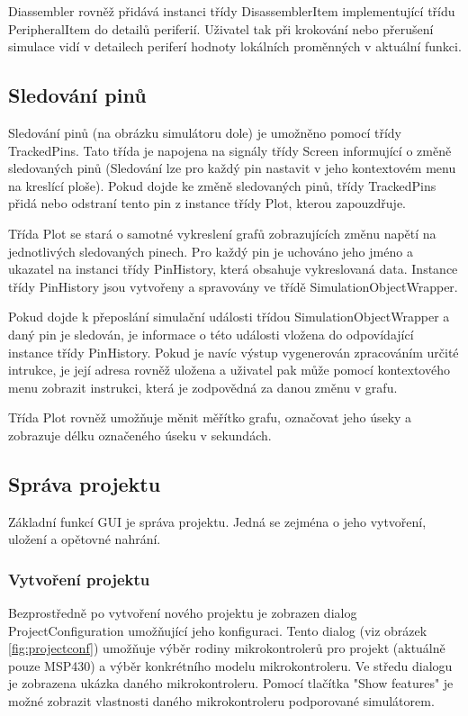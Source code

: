Diassembler rovněž přidává instanci třídy DisassemblerItem implementující třídu PeripheralItem do detailů periferií. Uživatel tak při krokování nebo přerušení simulace vidí v detailech periferí hodnoty lokálních proměnných v aktuální funkci.

\subsection{Sledování pinů}
\label{screen_tracking}

Sledování pinů (na obrázku simulátoru dole) je umožněno pomocí třídy TrackedPins. Tato třída je napojena na signály třídy Screen informující o změně sledovaných pinů (Sledování lze pro každý pin nastavit v jeho kontextovém menu na kreslící ploše). Pokud dojde ke změně sledovaných pinů, třídy TrackedPins přidá nebo odstraní tento pin z instance třídy Plot, kterou zapouzdřuje.

Třída Plot se stará o samotné vykreslení grafů zobrazujících změnu napětí na jednotlivých sledovaných pinech. Pro každý pin je uchováno jeho jméno a ukazatel na instanci třídy PinHistory, která obsahuje vykreslovaná data. Instance třídy PinHistory jsou vytvořeny a spravovány ve třídě SimulationObjectWrapper.

Pokud dojde k přeposlání simulační události třídou SimulationObjectWrapper a daný pin je sledován, je informace o této události vložena do odpovídající instance třídy PinHistory. Pokud je navíc výstup vygenerován zpracováním určité intrukce, je její adresa rovněž uložena a uživatel pak může pomocí kontextového menu zobrazit instrukci, která je zodpovědná za danou změnu v grafu.

Třída Plot rovněž umožňuje měnit měřítko grafu, označovat jeho úseky a zobrazuje délku označeného úseku v sekundách.

\subsection{Správa projektu}

Základní funkcí GUI je správa projektu. Jedná se zejména o jeho vytvoření, uložení a opětovné nahrání.

\subsubsection{Vytvoření projektu}

Bezprostředně po vytvoření nového projektu je zobrazen dialog ProjectConfiguration umožňující jeho konfiguraci. Tento dialog (viz obrázek \ref{fig:projectconf}) umožňuje výběr rodiny mikrokontrolerů pro projekt (aktuálně pouze MSP430) a výběr konkrétního modelu mikrokontroleru. Ve středu dialogu je zobrazena ukázka daného mikrokontroleru. Pomocí tlačítka "Show features" je možné zobrazit vlastnosti daného mikrokontroleru podporované simulátorem.

